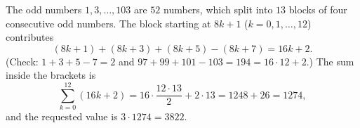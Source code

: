 The odd numbers $1,3,\dots,103$ are $52$ numbers, which split into $13$ blocks of four consecutive odd numbers. The block starting at $8k+1$ ($k=0,1,\dots,12$) contributes
\[
(8k+1)+(8k+3)+(8k+5)-(8k+7)=16k+2 .
\]
(Check: $1+3+5-7=2$ and $97+99+101-103=194=16\cdot12+2$.) The sum inside the brackets is
\[
\sum_{k=0}^{12}(16k+2)=16\cdot\dfrac{12\cdot13}{2}+2\cdot13=1248+26=1274,
\]
and the requested value is $3\cdot1274=\boxed{3822}$.

